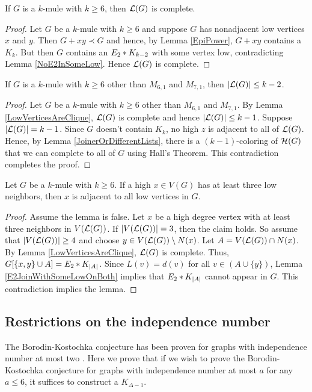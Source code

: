 \begin{lem}\label{LowVerticesAreClique}
If $G$ is a $k$-mule with $k \geq 6$, then $\mathcal{L}(G)$ is complete.
\end{lem}
\begin{proof}
Let $G$ be a $k$-mule with $k \geq 6$ and suppose $G$ has nonadjacent low
vertices $x$ and $y$. Then $G + xy \prec G$ and hence, by Lemma \ref{EpiPower}, $G + xy$ contains a $K_k$.  
But then $G$ contains an $E_2 \mbox{\hspace{2 pt}$\ast$\hspace{2 pt}} K_{k-2}$ with some vertex low, contradicting Lemma \ref{NoE2InSomeLow}.  
Hence $\mathcal{L}(G)$ is complete.
\end{proof}

\begin{lem}\label{LowVerticesAreFew}
If $G$ is a $k$-mule with $k \geq 6$ other than $M_{6,1}$ and $M_{7,1}$, then
$\left|\mathcal{L}(G)\right| \leq k - 2$.
\end{lem}
\begin{proof}
Let $G$ be a $k$-mule with $k \geq 6$ other than $M_{6,1}$ and $M_{7,1}$.  
By Lemma \ref{LowVerticesAreClique}, $\mathcal{L}(G)$ is complete and hence $\left|\mathcal{L}(G)\right| \leq k - 1$.  
Suppose $\left|\mathcal{L}(G)\right| = k - 1$.  
Since $G$ doesn't contain $K_k$, no high $z$ is adjacent to all of $\mathcal{L}(G)$.  
Hence, by Lemma \ref{JoinerOrDifferentLists}, there is a $(k - 1)$-coloring of $\mathcal{H}(G)$ that we can complete to all of $G$ using Hall's Theorem.  
This contradiction completes the proof.
\end{proof}

\begin{lem}\label{AtMostTwoIntoLowMule}
Let $G$ be a $k$-mule with $k \geq 6$.  If a high $x \in V(G)$ has at least
three low neighbors, then $x$ is adjacent to all low vertices in $G$.
\end{lem}
\begin{proof}
Assume the lemma is false.
Let $x$ be a high degree vertex with at least three neighbors in
$V(\mathcal{L}(G))$.  If $|V(\mathcal{L}(G))|=3$, then the claim holds.  So assume
that $|V(\mathcal{L}(G))|\ge 4$ and choose $y\in V(\mathcal{L}(G))\setminus N(x)$. 
Let $A=V(\mathcal{L}(G))\cap N(x)$.  By Lemma \ref{LowVerticesAreClique},
$\mathcal{L}(G)$ is complete.  Thus, $G[\{x,y\}\cup A]=E_2 \mbox{\hspace{2 pt}$\ast$\hspace{2 pt}} K_{|A|}$. 
Since $L(v)=d(v)$ for all $v\in (A\cup\{y\})$, Lemma
\ref{E2JoinWithSomeLowOnBoth} implies that $E_2 \mbox{\hspace{2 pt}$\ast$\hspace{2 pt}} K_{|A|}$ cannot appear
in $G$.  This contradiction implies the lemma.
\end{proof}

\subsection{Restrictions on the independence number}
The Borodin-Kostochka conjecture has been proven for graphs with independence
number at most two \cite{beutelspacher1984minimal}.  Here we prove that if we
wish to prove the Borodin-Kostochka conjecture for graphs with independence
number at most $a$ for any $a \leq 6$, it suffices to construct a $K_{\Delta
- 1}$.


